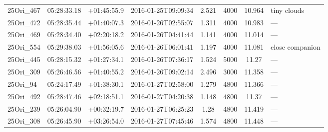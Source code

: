 \documentclass[12pt]{article}
\begin{document}
\begin{table}
\begin{center}
\begin{threeparttable}
\begin{tabular}{lccccccl}
	25Ori\_467    & 05:28:33.18 & +01:45:55.9 & 2016-01-25T09:09:34  & 2.521         & 4000             & 10.964 & tiny clouds              \\
	25Ori\_472    & 05:28:35.44 & +01:40:07.3 & 2016-01-26T02:55:07  & 1.311         & 4000             & 10.983 & ---                      \\
	25Ori\_469    & 05:28:34.40 & +02:20:18.2 & 2016-01-26T04:41:44  & 1.141         & 4000             & 11.014 & ---                      \\
	25Ori\_554    & 05:29:38.03 & +01:56:05.6 & 2016-01-26T06:01:41  & 1.197         & 4000             & 11.081 & close companion          \\
	25Ori\_445    & 05:28:15.32 & +01:27:34.1 & 2016-01-26T07:36:17  & 1.524         & 5000             & 11.27  & ---                      \\
	25Ori\_309    & 05:26:46.56 & +01:40:55.2 & 2016-01-26T09:02:14  & 2.496         & 3000             & 11.358 & ---                      \\
	25Ori\_94     & 05:24:17.49 & +01:38:30.1 & 2016-01-27T02:58:00  & 1.279         & 4800             & 11.366 & ---                      \\
	25Ori\_492    & 05:28:47.46 & +02:18:51.1 & 2016-01-27T04:20:38  & 1.148         & 4800             & 11.37  & ---                      \\
	25Ori\_239    & 05:26:04.90 & +00:32:19.7 & 2016-01-27T06:25:23  & 1.28          & 4800             & 11.419 & ---                      \\
	25Ori\_308    & 05:26:45.90 & +03:26:54.0 & 2016-01-27T07:45:46  & 1.574         & 4800             & 11.448 & ---                      \\
	\bottomrule
	\end{tabular}
 \end{threeparttable}
\end{center}
\end{table}
\end{document}

